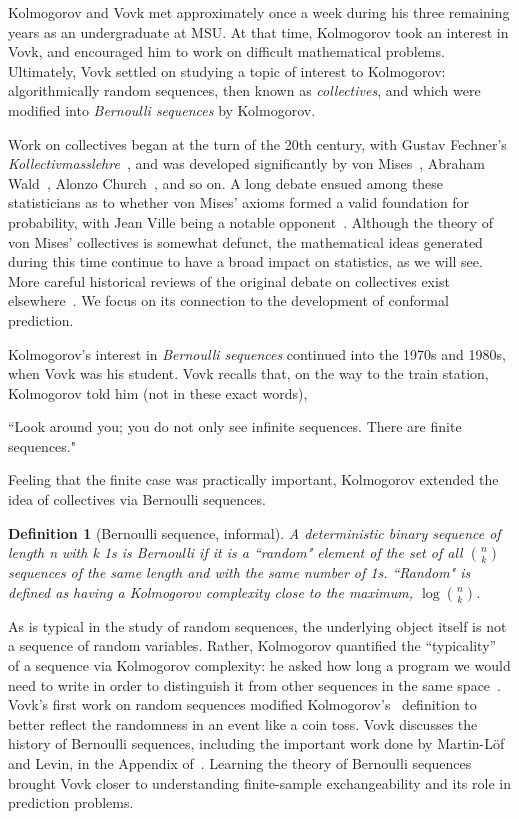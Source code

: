\documentclass[10pt]{article}
\newtheorem{definition}{Definition}
\begin{document}
Kolmogorov and Vovk met approximately once a week during his three remaining years as an undergraduate at MSU.
At that time, Kolmogorov took an interest in Vovk, and encouraged him to work on difficult mathematical problems.
Ultimately, Vovk settled on studying a topic of interest to Kolmogorov: algorithmically random sequences, then known as \emph{collectives}, and which were modified into \emph{Bernoulli sequences} by Kolmogorov.

Work on collectives began at the turn of the 20th century, with Gustav Fechner's \emph{Kollectivmasslehre}~\cite{fechner1897kollektivmasslehre}, and was developed significantly by von Mises~\cite{mises1919grundlagen}, Abraham Wald~\cite{wald1937widerspruchfreiheit}, Alonzo Church~\cite{church1940concept}, and so on.
A long debate ensued among these statisticians as to whether von Mises' axioms formed a valid foundation for probability, with Jean Ville being a notable opponent~\cite{ville1939etude}.
Although the theory of von Mises' collectives is somewhat defunct, the mathematical ideas generated during this time continue to have a broad impact on statistics, as we will see.
More careful historical reviews of the original debate on collectives exist elsewhere~\cite{shafer2006sources,church1940concept,vovk2001kolmogorov,porter2014kolmogorov}.
We focus on its connection to the development of conformal prediction.

Kolmogorov's interest in  \emph{Bernoulli sequences} continued into the 1970s and 1980s, when Vovk was his student.
Vovk recalls that, on the way to the train station, Kolmogorov told him (not in these exact words),
\begin{center}
    ``Look around you; you do not only see infinite sequences. There are finite sequences."
\end{center}
Feeling that the finite case was practically important, Kolmogorov extended the idea of collectives via Bernoulli sequences.
\begin{definition}[Bernoulli sequence, informal]
  A deterministic binary sequence of length n with k 1s is Bernoulli if it is a ``random" element of the set of all $\binom{n}{k}$ sequences of the same length and with the same number of 1s. ``Random" is defined as having a Kolmogorov complexity close to the maximum, $\log \binom{n}{k}$.
\end{definition}

As is typical in the study of random sequences, the underlying object itself is not a sequence of random variables. Rather, Kolmogorov quantified the ``typicality'' of a sequence via Kolmogorov complexity: he asked how long a program we would need to write in order to distinguish it from other sequences in the same space~\cite{kolmogorov1965three,kolmogorov1968logical,kolmogorov1983combinatorial}.
Vovk's first work on random sequences modified Kolmogorov's~\cite{vovk1986firstpaper} definition to better reflect the randomness in an event like a coin toss.
Vovk discusses the history of Bernoulli sequences, including the important work done by Martin-L\"of and Levin, in the Appendix of~\cite{vovk2021testing}.
Learning the theory of Bernoulli sequences brought Vovk closer to understanding finite-sample exchangeability and its role in prediction problems.
\end{document}
